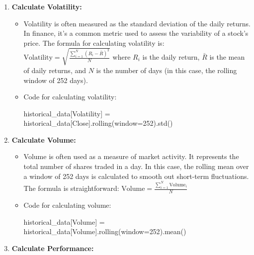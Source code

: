 \documentclass[
  letterpaper,
  DIV=11,
  numbers=noendperiod]{scrreprt}
\newenvironment{Shaded}{\begin{snugshade}}{\end{snugshade}}
\newcommand{\DecValTok}[1]{\textcolor[rgb]{0.68,0.00,0.00}{#1}}
\newcommand{\NormalTok}[1]{\textcolor[rgb]{0.00,0.23,0.31}{#1}}
\newcommand{\OperatorTok}[1]{\textcolor[rgb]{0.37,0.37,0.37}{#1}}
\newcommand{\StringTok}[1]{\textcolor[rgb]{0.13,0.47,0.30}{#1}}
\begin{document}
\begin{enumerate}
\def\labelenumi{\arabic{enumi}.}
\item
  \textbf{Calculate Volatility:}

  \begin{itemize}
  \item
    Volatility is often measured as the standard deviation of the daily
    returns. In finance, it's a common metric used to assess the
    variability of a stock's price. The formula for calculating
    volatility is:
    \(\text{Volatility} = \sqrt{\frac{\sum_{i=1}^{N}(R_i - \bar{R})^2}{N}}\)
    where \(R_i\) is the daily return, \(\bar{R}\) is the mean of daily
    returns, and \(N\) is the number of days (in this case, the rolling
    window of 252 days).
  \item
    Code for calculating volatility:

\begin{Shaded}
\begin{Highlighting}[]
\NormalTok{historical\_data[}\StringTok{\textquotesingle{}Volatility\textquotesingle{}}\NormalTok{] }\OperatorTok{=}\NormalTok{ historical\_data[}\StringTok{\textquotesingle{}Close\textquotesingle{}}\NormalTok{].rolling(window}\OperatorTok{=}\DecValTok{252}\NormalTok{).std() }
\end{Highlighting}
\end{Shaded}
  \end{itemize}
\item
  \textbf{Calculate Volume:}

  \begin{itemize}
  \item
    Volume is often used as a measure of market activity. It represents
    the total number of shares traded in a day. In this case, the
    rolling mean over a window of 252 days is calculated to smooth out
    short-term fluctuations. The formula is straightforward:
    \(\text{Volume} = \frac{\sum_{i=1}^{N}\text{Volume}_i}{N}\)
  \item
    Code for calculating volume:

\begin{Shaded}
\begin{Highlighting}[]
\NormalTok{historical\_data[}\StringTok{\textquotesingle{}Volume\textquotesingle{}}\NormalTok{] }\OperatorTok{=}\NormalTok{ historical\_data[}\StringTok{\textquotesingle{}Volume\textquotesingle{}}\NormalTok{].rolling(window}\OperatorTok{=}\DecValTok{252}\NormalTok{).mean()}
\end{Highlighting}
\end{Shaded}
  \end{itemize}
\item
  \textbf{Calculate Performance:}


\end{enumerate}
\end{document}
